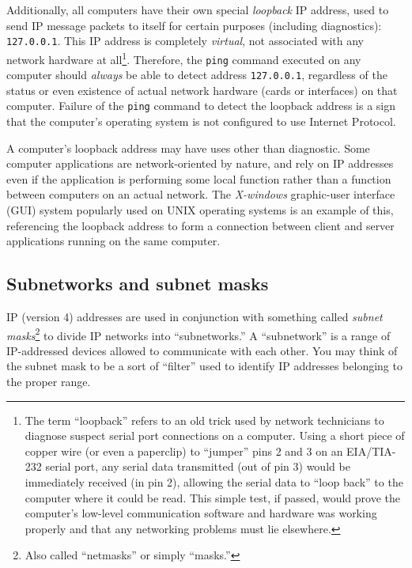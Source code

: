 Additionally, all computers have their own special \textit{loopback} IP address, used to send IP message packets to itself for certain purposes (including diagnostics): \texttt{127.0.0.1}.  This IP address is completely \textit{virtual}, not associated with any network hardware at all\footnote{The term ``loopback'' refers to an old trick used by network technicians to diagnose suspect serial port connections on a computer.  Using a short piece of copper wire (or even a paperclip) to ``jumper'' pins 2 and 3 on an EIA/TIA-232 serial port, any serial data transmitted (out of pin 3) would be immediately received (in pin 2), allowing the serial data to ``loop back'' to the computer where it could be read.  This simple test, if passed, would prove the computer's low-level communication software and hardware was working properly and that any networking problems must lie elsewhere.}.  Therefore, the \texttt{ping} command executed on any computer should \textit{always} be able to detect address \texttt{127.0.0.1}, regardless of the status or even existence of actual network hardware (cards or interfaces) on that computer.  Failure of the \texttt{ping} command to detect the loopback address is a sign that the computer's operating system is not configured to use Internet Protocol.  

A computer's loopback address may have uses other than diagnostic.  Some computer applications are network-oriented by nature, and rely on IP addresses even if the application is performing some local function rather than a function between computers on an actual network.  The \textit{X-windows} graphic-user interface (GUI) system popularly used on UNIX operating systems is an example of this, referencing the loopback address to form a connection between client and server applications running on the same computer.      








\filbreak
\subsection{Subnetworks and subnet masks}

IP (version 4) addresses are used in conjunction with something called \textit{subnet masks}\footnote{Also called ``netmasks'' or simply ``masks.''} to divide IP networks into ``subnetworks.''  A ``subnetwork'' is a range of IP-addressed devices allowed to communicate with each other.  You may think of the subnet mask to be a sort of ``filter'' used to identify IP addresses belonging to the proper range.    


